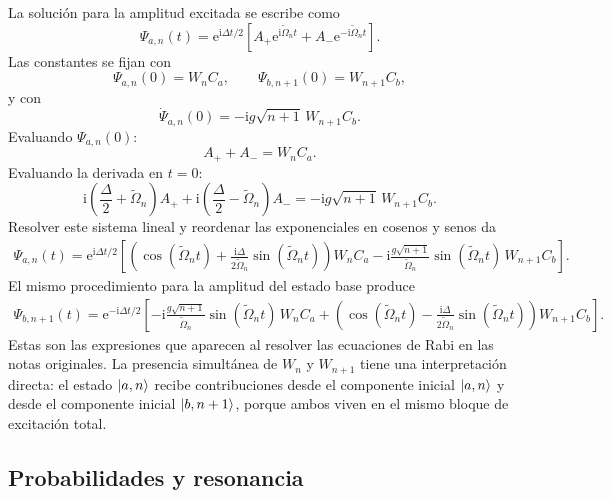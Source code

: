 \documentclass[11pt]{article}
\newcommand{\ii}{\mathrm{i}}
\newcommand{\ee}{\mathrm{e}}
\newcommand{\Omn}{\tilde\Omega_n}
\begin{document}
La soluci\'on para la amplitud excitada se escribe como
\begin{equation}
  \Psi_{a,n}(t)
  =
  \ee^{\ii\Delta t/2}
  \left[
  A_+\ee^{\ii\Omn t}
  +
  A_-\ee^{-\ii\Omn t}
  \right].
\end{equation}
Las constantes se fijan con
\begin{equation}
  \Psi_{a,n}(0)=W_n C_a,
  \qquad
  \Psi_{b,n+1}(0)=W_{n+1}C_b,
\end{equation}
y con
\begin{equation}
  \dot\Psi_{a,n}(0)
  =
  -\ii g\sqrt{n+1}\,W_{n+1}C_b.
\end{equation}
Evaluando $\Psi_{a,n}(0)$:
\begin{equation}
  A_+ + A_- = W_n C_a.
\end{equation}
Evaluando la derivada en $t=0$:
\begin{equation}
  \ii\left(\frac{\Delta}{2}+\Omn\right)A_+
  +
  \ii\left(\frac{\Delta}{2}-\Omn\right)A_-
  =
  -\ii g\sqrt{n+1}\,W_{n+1}C_b.
\end{equation}
Resolver este sistema lineal y reordenar las exponenciales en cosenos y senos
da
\begin{align}
  \boxed{
  \Psi_{a,n}(t)
  =
  \ee^{\ii\Delta t/2}
  \left[
  \left(
  \cos(\Omn t)
  +
  \frac{\ii\Delta}{2\Omn}\sin(\Omn t)
  \right)W_n C_a
  -
  \ii\frac{g\sqrt{n+1}}{\Omn}\sin(\Omn t)\,W_{n+1}C_b
  \right].
  }
\end{align}
El mismo procedimiento para la amplitud del estado base produce
\begin{align}
  \boxed{
  \Psi_{b,n+1}(t)
  =
  \ee^{-\ii\Delta t/2}
  \left[
  -\ii\frac{g\sqrt{n+1}}{\Omn}\sin(\Omn t)\,W_n C_a
  +
  \left(
  \cos(\Omn t)
  -
  \frac{\ii\Delta}{2\Omn}\sin(\Omn t)
  \right)W_{n+1}C_b
  \right].
  }
\end{align}
Estas son las expresiones que aparecen al resolver las ecuaciones de Rabi en
las notas originales. La presencia simult\'anea de $W_n$ y $W_{n+1}$ tiene una
interpretaci\'on directa: el estado $\ket{a,n}$ recibe contribuciones desde el
componente inicial $\ket{a,n}$ y desde el componente inicial $\ket{b,n+1}$,
porque ambos viven en el mismo bloque de excitaci\'on total.

\subsection{Probabilidades y resonancia}
\end{document}

